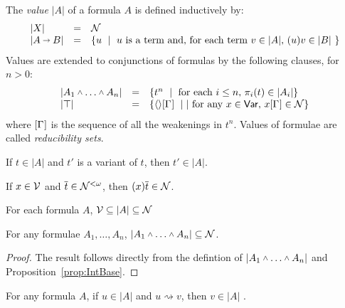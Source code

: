 \documentclass[orivec]{llncs}
\begin{document}
\begin{ALdefinition}
The \emph{value} $|A|$ of a formula $A$ is defined inductively by:
\[
\begin{array}{lll}
|X| & = & \mathcal{N}
\\
|A\vlim B| & = & \mbox{\{$u$ \;|\;  $u$ is a term and, for each term $v\in |A|$, $(u)v \in |B|$ \}}
\end{array}
\]
Values are extended to conjunctions of formulas by the following clauses, for $n>0$:
\[
\begin{array}{lll}
|A_1\vlan\dots\vlan A_n| & = & \mbox{\{$t^n$ \;|\; for each $i\leq n$, $\pi_i(t) \in |A_i|$\}}
\\
|\top| & = & \mbox{\{$\tup*{}\G$ \;|\;| for any $x\in\Var$, $x\G\in\SN$\}}
\end{array}
\]
where $\G$ is the sequence of all the weakenings in $t^n$.
%
Values of formulae are called {\em reducibility sets}. \\
\end{ALdefinition}


\begin{remark}
If $t\in|A|$ and $t'$ is a variant of $t$, then $t'\in|A|$.
\end{remark}

\begin{ALlemma}\label{lem:HeadVar}
If $x\in \mathcal{V}$ and $\overline{t} \in \mathcal{N}^{<\omega}$, then
$(x)\overline{t} \in \mathcal{N}$.
\end{ALlemma}

\begin{ALproposition}\label{prop:IntBase}
For each formula $A$, $\mathcal{V} \subseteq |A| \subseteq  \mathcal{N}$
\end{ALproposition}

\begin{ALproposition}
 For any formulae $A_1,\dots,A_n$, $|A_1\vlan\dots\vlan A_n| \subseteq \SN$.
\end{ALproposition}

\begin{proof}
The result follows directly from the defintion of  $|A_1\vlan\dots\vlan A_n|$ and Proposition~\ref{prop:IntBase}.
\end{proof}

\begin{ALlemma}\label{lem:RedStab}
For any formula $A$,  if $u\in |A|$ and $u \rightsquigarrow v$, then $v \in |A|$ .
\end{ALlemma}
\end{document}
